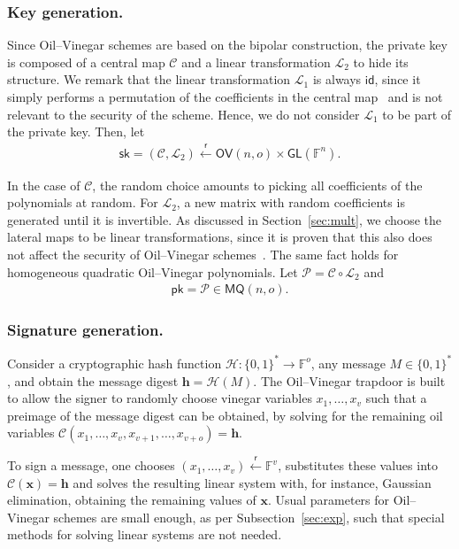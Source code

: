 \documentclass[english]{ufsc-thesis-rn46-2019/ufsc-thesis-rn46-2019}
\newcommand{\random}{\overset{\mathsf{r}}{\gets}}
\theoremstyle{definition}
\begin{document}
\subsubsection{Key generation.}

Since Oil--Vinegar schemes are based on the bipolar construction, the private
key is composed of a central map $\mathcal{C}$ and a linear transformation
$\mathcal{L}_{2}$ to hide its structure. We remark that the linear
transformation $\mathcal{L}_{1}$ is always $\mathsf{id}$, since it simply
performs a permutation of the coefficients in the central
map~\cite[p.~71]{Thomae:201306} and is not relevant to the security of the
scheme. Hence, we do not consider $\mathcal{L}_{1}$ to be part of the private
key. Then, let
\begin{align}\label{eq:sk-uov}
  \mathsf{sk} = (\mathcal{C}, \mathcal{L}_{2})
    \random \mathsf{OV}(n, o) \times \mathsf{GL}(\mathbb{F}^{n}).
\end{align}

In the case of $\mathcal{C}$, the random choice amounts to picking all
coefficients of the polynomials at random. For $\mathcal{L}_{2}$, a new matrix
with random coefficients is generated until it is invertible. As discussed in
Section~\ref{sec:mult}, we choose the lateral maps to be linear
transformations, since it is proven that this also does not affect the security
of Oil--Vinegar schemes~\cite[Sec.~3.1]{Braeken:200502}. The same fact holds
for homogeneous quadratic Oil--Vinegar polynomials. Let
$\mathcal{P} = \mathcal{C} \circ \mathcal{L}_{2}$ and
\begin{align}\label{eq:pk-uov}
  \mathsf{pk} = \mathcal{P} \in \mathsf{MQ}(n, o).
\end{align}

\subsubsection{Signature generation.}

Consider a cryptographic hash function
$\mathcal{H} : {\{0, 1\}}^{*} \to \mathbb{F}^{o}$, any message
$M \in {\{0, 1\}}^{*}$, and obtain the message digest
$\mathbf{h} = \mathcal{H}(M)$. The Oil--Vinegar trapdoor is built to allow the
signer to randomly choose vinegar variables $x_{1}, \dots, x_{v}$ such that
a preimage of the message digest can be obtained, by solving for the remaining
oil variables
$\mathcal{C}(x_{1}, \dots, x_{v}, x_{v + 1}, \dots, x_{v + o}) = \mathbf{h}$.

To sign a message, one chooses $(x_{1}, \dots, x_{v}) \random \mathbb{F}^{v}$,
substitutes these values into $\mathcal{C}(\mathbf{x}) = \mathbf{h}$ and solves
the resulting linear system with, for instance, Gaussian elimination, obtaining
the remaining values of $\mathbf{x}$. Usual parameters for Oil--Vinegar schemes
are small enough, as per Subsection~\ref{sec:exp}, such that special methods
for solving linear systems are not needed.
\end{document}
